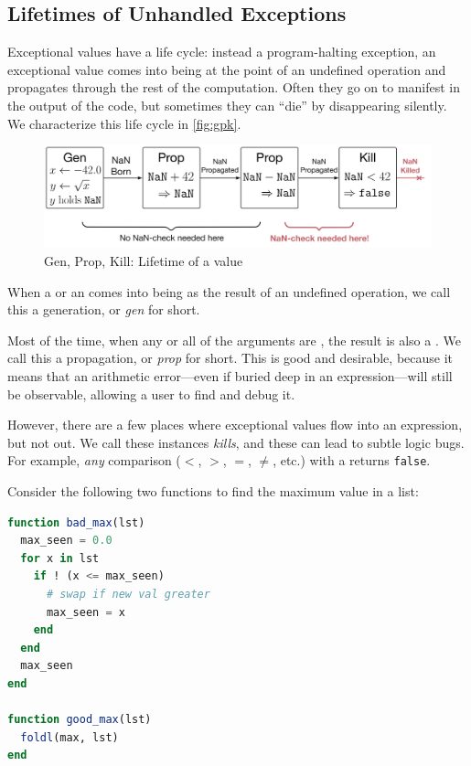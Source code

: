 \documentclass{juliacon}
\begin{document}
\subsection{Lifetimes of Unhandled Exceptions}
\label{s:to-kill-a-fp}

Exceptional values have a life cycle: instead a program-halting exception, an exceptional value comes into being at the point of an undefined operation and propagates through the rest of the computation.
Often they go on to manifest in the output of the code, but sometimes they can ``die'' by disappearing silently.
We characterize this life cycle in \cref{fig:gpk}.

\begin{figure}[ht]
  \includegraphics[width=\columnwidth]{fig/genpropkill-outline.png}
  \caption{Gen, Prop, Kill: Lifetime of a \NaN{} value}
  \label{f:gpk}
\end{figure}

When a \NaN{} or an \Inf{} comes into being as the result of an undefined operation, we call this a generation, or \emph{gen} for short.

Most of the time, when any or all of the arguments are \NaN{}, the result is also a \NaN{}.
We call this a propagation, or \emph{prop} for short.
This is good and desirable, because it means that an arithmetic error---even if buried deep in an expression---will still be observable, allowing a user to find and debug it.

However, there are a few places where exceptional values flow into an expression, but not out.
We call these instances \emph{kills}, and these can lead to subtle logic bugs.
For example, \emph{any} comparison ($<$, $>$, $=$, $\neq$, etc.) with a \NaN{} returns \texttt{false}.

Consider the following two functions to find the maximum value in a list:

\begin{lstlisting}[language = Julia]
function bad_max(lst)
  max_seen = 0.0
  for x in lst
    if ! (x <= max_seen)
      # swap if new val greater
      max_seen = x
    end
  end
  max_seen
end

function good_max(lst)
  foldl(max, lst)
end
\end{lstlisting}
\end{document}
